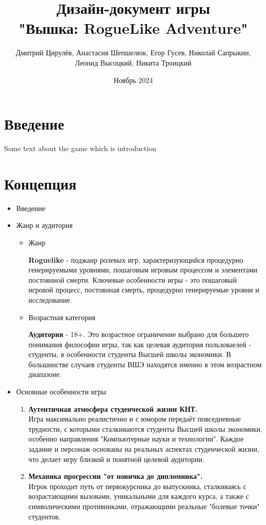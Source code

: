 \documentclass{article}
\title{Дизайн-документ игры \\"Вышка: RogueLike Adventure"}
\author{Дмитрий Цирулёв, Анастасия Шепшелюк, Егор Гусев, Николай Сапрыкин, Леонид Высоцкий, Никита Троицкий }
\date{Ноябрь 2024}
\begin{document}
\maketitle

\tableofcontents
\newpage
\section{Введение}
Some text about the game which is introduction
\newpage
\section{Концепция}
\begin{itemize}
    \item Введение
    \item Жанр и аудитория
    \begin{itemize}
        \item Жанр \par
        \textbf{Roguelike} - поджанр ролевых игр, характеризующийся процедурно генерируемыми уровнями, пошаговым игровым процессом и элементами постоянной смерти. Ключевые особенности игры - это пошаговый игровой процесс, постоянная смерть, процедурно генерируемые уровни и исследование. 
        \item Возрастная категория \par
        \textbf{Аудитория} - 18+. Это возрастное ограничение выбрано для большего понимания философии игры, так как целевая аудитория пользоваелей - студенты, в особенности студенты Высшей школы экономики. В большинстве случаев студенты ВШЭ находятся именно в этом возрастном диапазоне.
    \end{itemize}
    \item Основные особенности игры
    \begin{enumerate}
    \item \textbf{Аутентичная атмосфера студенческой жизни КНТ.} \\
    Игра максимально реалистично и с юмором передаёт повседневные трудности, с которыми сталкиваются студенты Высшей школы экономики, особенно направления "Компьютерные науки и технологии". Каждое задание и персонаж основаны на реальных аспектах студенческой жизни, что делает игру близкой и понятной целевой аудитории.

    \item \textbf{Механика прогрессии "от новичка до дипломника".} \\
    Игрок проходит путь от первокурсника до выпускника, сталкиваясь с возрастающими вызовами, уникальными для каждого курса, а также с символическими противниками, отражающими реальные "болевые точки" студентов.


\end{enumerate}
\end{itemize}
\end{document}
